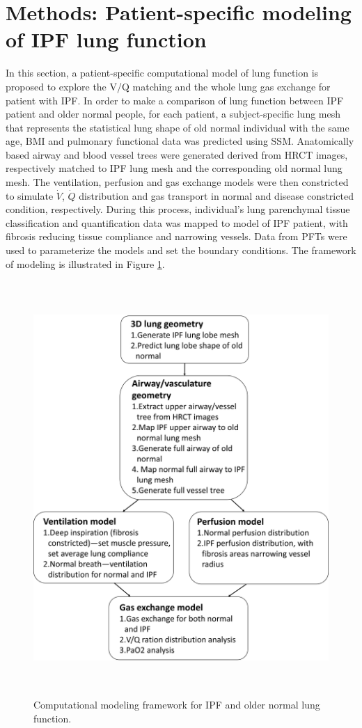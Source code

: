 \section{Methods: Patient-specific modeling of IPF lung function}
In this section, a patient-specific computational model of lung function is proposed to explore the V/Q matching and the whole lung gas exchange for patient with IPF. In order to make a comparison of lung function between IPF patient and older normal people, for each patient, a subject-specific lung mesh that represents the statistical lung shape of old normal individual with the same age, BMI and pulmonary functional data was predicted using SSM. Anatomically based airway and blood vessel trees were generated derived from HRCT images, respectively matched to IPF lung mesh and the corresponding old normal lung mesh. The ventilation, perfusion and gas exchange models were then constricted to simulate $\dot{V}$, $\dot{Q}$ distribution and gas transport in normal and disease constricted condition, respectively. During this process, individual's lung parenchymal tissue classification and quantification data was mapped to model of IPF patient, with fibrosis reducing tissue compliance and narrowing vessels. Data from PFTs were used to parameterize the models and set the boundary conditions. The framework of modeling is illustrated in Figure \ref{fig:WholeFramework}. 

\begin{figure}[htbp]
  \centering 
  \includegraphics[height=6.2in]{ModelBasedAnalysis/Image/WholeFramework.png}
  \caption{Computational modeling framework for IPF and older normal lung function. }
  \label{fig:WholeFramework}
\end{figure}

